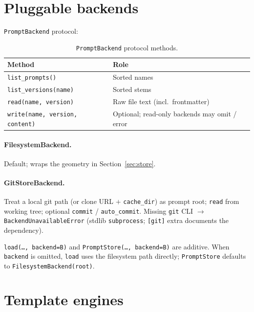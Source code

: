 \documentclass[11pt,a4paper]{article}
\newcommand{\code}[1]{\texttt{#1}}
\begin{document}
\section{Pluggable backends}

\code{PromptBackend} protocol:

\begin{table}[htbp]
  \centering
  \begin{tabular}{@{}ll@{}}
    \toprule
    \textbf{Method} & \textbf{Role} \\
    \midrule
    \code{list\_prompts()}
      & Sorted names \\
    \code{list\_versions(name)}
      & Sorted stems \\
    \code{read(name, version)}
      & Raw file text (incl.\ frontmatter) \\
    \code{write(name, version, content)}
      & Optional; read-only backends may omit / error \\
    \bottomrule
  \end{tabular}
  \caption{\texttt{PromptBackend} protocol methods.}
  \label{tab:backend-protocol}
\end{table}

\paragraph{FilesystemBackend.}
Default; wraps the geometry in Section~\ref{sec:store}.

\paragraph{GitStoreBackend.}
Treat a local git path (or clone URL $+$ \code{cache\_dir}) as prompt root;
\code{read} from working tree; optional \code{commit} / \code{auto\_commit}.
Missing \code{git} CLI $\rightarrow$ \code{BackendUnavailableError}
(stdlib \code{subprocess}; \code{[git]} extra documents the dependency).

\code{load(\ldots, backend=B)} and \code{PromptStore(\ldots, backend=B)} are
additive. When \code{backend} is omitted, \code{load} uses the filesystem path
directly; \code{PromptStore} defaults to \code{FilesystemBackend(root)}.

\section{Template engines}
\label{sec:templates}
\end{document}
